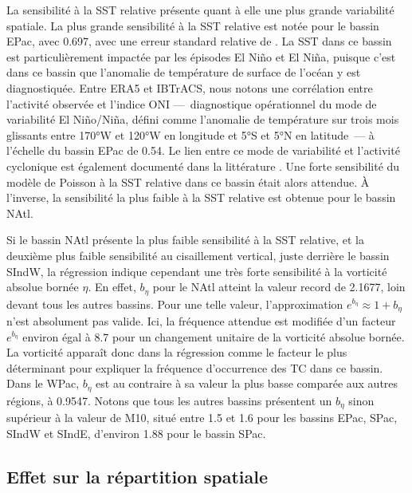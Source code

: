 \documentclass[../main.tex]{subfiles}
\begin{document}
La sensibilité à la SST relative présente quant à elle une plus grande variabilité spatiale. La plus grande sensibilité à la SST relative est notée pour le
bassin EPac, avec \num{0.697}, avec une erreur standard relative de . La SST dans ce bassin est particulièrement impactée par les épisodes El Niño et El
Niña, puisque c'est dans ce bassin que l'anomalie de température de surface de l'océan y est diagnostiquée. Entre ERA5 et IBTrACS, nous notons une corrélation
entre l'activité observée et l'indice ONI ---~diagnostique opérationnel du mode de variabilité El Niño/Niña, défini comme l'anomalie de température sur trois
mois glissants entre \ang{170}W et \ang{120}W en longitude et \ang{5}S et \ang{5}N en latitude~--- à l'échelle du bassin EPac de \num{0.54}. Le lien entre ce
mode de variabilité et l'activité cyclonique est également documenté dans la littérature \parencite{camargo_use_2007,lin_enso_2020}. Une forte
sensibilité du modèle de Poisson à la SST relative dans ce bassin était alors attendue. À l'inverse, la sensibilité la plus faible à la SST relative est obtenue
pour le bassin NAtl.

Si le bassin NAtl présente la plus faible sensibilité à la SST relative, et la deuxième plus faible sensibilité au cisaillement vertical, juste derrière le
bassin SIndW, la régression indique cependant une très forte sensibilité à la vorticité absolue bornée $\eta$. En effet, $b_\eta$ pour le NAtl atteint la valeur
record de \num{2.1677}, loin devant tous les autres bassins. Pour une telle valeur, l'approximation $e^{b_\eta} \approx 1 + b_\eta$ n'est absolument pas valide.
Ici, la fréquence attendue est modifiée d'un facteur $e^{b_\eta}$ environ égal à \num{8.7} pour un changement unitaire de la vorticité absolue bornée. La
vorticité apparaît donc dans la régression comme le facteur le plus déterminant pour expliquer la fréquence d'occurrence des TC dans ce bassin. Dans le WPac,
$b_\eta$ est au contraire à sa valeur la plus basse comparée aux autres régions, à \num{0.9547}. Notons que tous les autres bassins présentent un $b_\eta$ sinon
supérieur à la valeur de M10, situé entre \num{1.5} et \num{1.6} pour les bassins EPac, SPac, SIndW et SIndE, d'environ \num{1.88} pour le bassin SPac.

\subsection{Effet sur la répartition spatiale}
\end{document}
